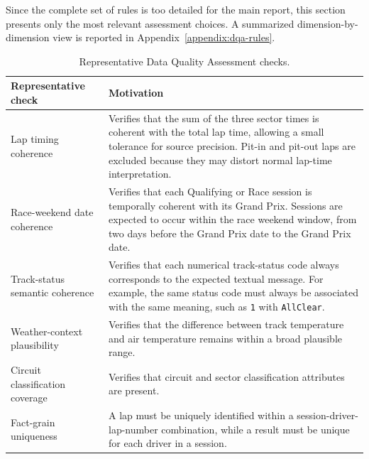 \documentclass[11pt,a4paper]{article}
\begin{document}
	

	Since the complete set of rules is too detailed for the main report, this section presents only the most relevant assessment choices. A summarized dimension-by-dimension view is reported in Appendix~\ref{appendix:dqa-rules}.
	
	

	\begin{table}[H]
		\centering
		\small
		\caption{Representative Data Quality Assessment checks.}
		\label{tab:representative-dqa-checks}
		\begin{tabularx}{\linewidth}{p{5cm}X}
			\toprule
			\textbf{Representative check}
			& \textbf{Motivation} \\
			\midrule
			
			Lap timing coherence
			& Verifies that the sum of the three sector times is coherent with the total lap time, allowing a small tolerance for source precision. Pit-in and pit-out laps are excluded because they may distort normal lap-time interpretation. \\
			
			\midrule
			
			Race-weekend date coherence
			& Verifies that each Qualifying or Race session is temporally coherent with its Grand Prix. Sessions are expected to occur within the race weekend window, from two days before the Grand Prix date to the Grand Prix date. \\
			\midrule
			
			Track-status semantic coherence
			& Verifies that each numerical track-status code always corresponds to the expected textual message. For example, the same status code must always be associated with the same meaning, such as \texttt{1} with \texttt{AllClear}. \\
			
			\midrule
			
			Weather-context plausibility
			& Verifies that the difference between track temperature and air temperature remains within a broad plausible range. \\
			
			\midrule
			
			Circuit classification coverage
			& Verifies that circuit and sector classification attributes are present. \\
			
			\midrule
			
			Fact-grain uniqueness
			& A lap must be uniquely identified within a session-driver-lap-number combination, while a result must be unique for each driver in a session. \\
			
			\bottomrule
		\end{tabularx}
	\end{table}
\end{document}
